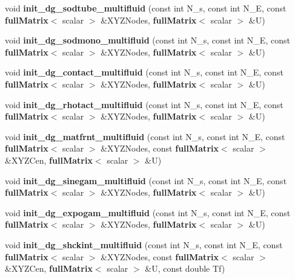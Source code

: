 \begin{DoxyCompactItemize}
\item 
void {\bfseries init\-\_\-dg\-\_\-sodtube\-\_\-multifluid} (const int N\-\_\-s, const int N\-\_\-\-E, const {\bf full\-Matrix}$<$ scalar $>$ \&X\-Y\-Z\-Nodes, {\bf full\-Matrix}$<$ scalar $>$ \&U)\label{init__cond_8cc_a13f2401a9ad8ecadf104bb1979d6abb7}

\item 
void {\bfseries init\-\_\-dg\-\_\-sodmono\-\_\-multifluid} (const int N\-\_\-s, const int N\-\_\-\-E, const {\bf full\-Matrix}$<$ scalar $>$ \&X\-Y\-Z\-Nodes, {\bf full\-Matrix}$<$ scalar $>$ \&U)\label{init__cond_8cc_aedd0a8830a24370417296a7cc268c626}

\item 
void {\bfseries init\-\_\-dg\-\_\-contact\-\_\-multifluid} (const int N\-\_\-s, const int N\-\_\-\-E, const {\bf full\-Matrix}$<$ scalar $>$ \&X\-Y\-Z\-Nodes, {\bf full\-Matrix}$<$ scalar $>$ \&U)\label{init__cond_8cc_ab62ad158c606f821436b483b56c23d6a}

\item 
void {\bfseries init\-\_\-dg\-\_\-rhotact\-\_\-multifluid} (const int N\-\_\-s, const int N\-\_\-\-E, const {\bf full\-Matrix}$<$ scalar $>$ \&X\-Y\-Z\-Nodes, {\bf full\-Matrix}$<$ scalar $>$ \&U)\label{init__cond_8cc_a3afd9ee6675095249e3d011aa306917f}

\item 
void {\bfseries init\-\_\-dg\-\_\-matfrnt\-\_\-multifluid} (const int N\-\_\-s, const int N\-\_\-\-E, const {\bf full\-Matrix}$<$ scalar $>$ \&X\-Y\-Z\-Nodes, const {\bf full\-Matrix}$<$ scalar $>$ \&X\-Y\-Z\-Cen, {\bf full\-Matrix}$<$ scalar $>$ \&U)\label{init__cond_8cc_a35b48cc18f1bbb070aeefe7fdbdd6dd8}

\item 
void {\bfseries init\-\_\-dg\-\_\-sinegam\-\_\-multifluid} (const int N\-\_\-s, const int N\-\_\-\-E, const {\bf full\-Matrix}$<$ scalar $>$ \&X\-Y\-Z\-Nodes, {\bf full\-Matrix}$<$ scalar $>$ \&U)\label{init__cond_8cc_a4d9a8eea46e0cf15246d2099dd0d6f23}

\item 
void {\bfseries init\-\_\-dg\-\_\-expogam\-\_\-multifluid} (const int N\-\_\-s, const int N\-\_\-\-E, const {\bf full\-Matrix}$<$ scalar $>$ \&X\-Y\-Z\-Nodes, {\bf full\-Matrix}$<$ scalar $>$ \&U)\label{init__cond_8cc_a6818d28db7e076a0d50e1160595a4451}

\item 
void {\bfseries init\-\_\-dg\-\_\-shckint\-\_\-multifluid} (const int N\-\_\-s, const int N\-\_\-\-E, const {\bf full\-Matrix}$<$ scalar $>$ \&X\-Y\-Z\-Nodes, const {\bf full\-Matrix}$<$ scalar $>$ \&X\-Y\-Z\-Cen, {\bf full\-Matrix}$<$ scalar $>$ \&U, const double Tf)\label{init__cond_8cc_a15e7b1d58fbc0e0d1ded98c9eeb8ef16}


\end{DoxyCompactItemize}
